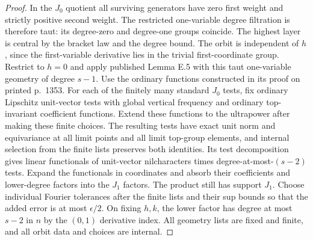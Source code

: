 \documentclass[11pt]{article}
\begin{document}
\begin{proof}
In the $J_0$ quotient all surviving generators have zero first
weight and strictly positive second weight. The restricted
one-variable degree filtration is therefore taut: its degree-zero
and degree-one groups coincide. The highest layer is central by
the bracket law and the degree bound. The orbit is independent
of $h$, since the first-variable derivative lies in the trivial
first-coordinate group. Restrict to $h=0$ and apply published
Lemma E.5 with this taut one-variable geometry of degree $s-1$.
Use the ordinary functions constructed in its proof on printed p.~1353.
For each of the finitely many standard $J_0$ tests, fix ordinary Lipschitz
unit-vector tests with global vertical frequency and ordinary top-invariant
coefficient functions. Extend these functions to the ultrapower after making
these finite choices. The resulting tests have exact unit norm and
equivariance at all limit points and all limit top-group elements, and
internal selection from the finite lists preserves both identities.
Its test decomposition gives linear functionals of unit-vector
nilcharacters times degree-at-most-$(s-2)$ tests. Expand the
functionals in coordinates and absorb their coefficients and
lower-degree factors into the $J_1$ factors. The product still
has support $J_1$. Choose individual Fourier tolerances after
the finite lists and their sup bounds so that the added error
is at most $\epsilon/2$. On fixing $h,k$, the lower factor has
degree at most $s-2$ in $n$ by the $(0,1)$ derivative index.
All geometry lists are fixed and finite, and all orbit data
and choices are internal.
\end{proof}
\end{document}
